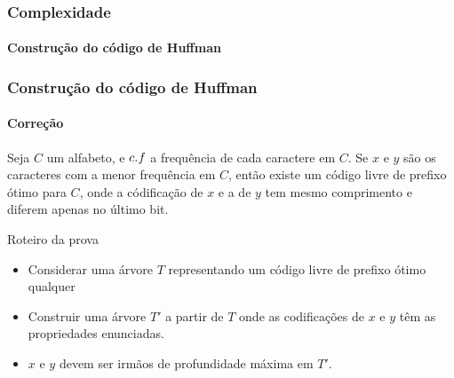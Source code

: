 \documentclass{beamer}
\begin{document}
\begin{frame}
\frametitle{Complexidade}
\framesubtitle{Construção do código de Huffman}

\end{frame}

\begin{frame}
\frametitle{Construção do código de Huffman}
\framesubtitle{Correção}

\begin{lemma}
Seja $C$ um alfabeto, e $\attrib{c}{f}$ a frequência de cada caractere em
$C$.  Se $x$ e $y$ são os caracteres com a menor frequência em $C$, então existe
um código livre de prefixo ótimo para $C$, onde a códificação de $x$ e a de $y$
tem mesmo comprimento e diferem apenas no último bit.
\end{lemma}

Roteiro da prova
\begin{itemize}
\item Considerar uma árvore $T$ representando um código livre de prefixo ótimo
  \alert{qualquer}
\item Construir uma árvore $T'$ a partir de $T$ onde as codificações de $x$ e $y$ têm
  as propriedades enunciadas.
\item $x$ e $y$ devem ser irmãos de profundidade máxima em $T'$.
\end{itemize}

\end{frame}
\end{document}
